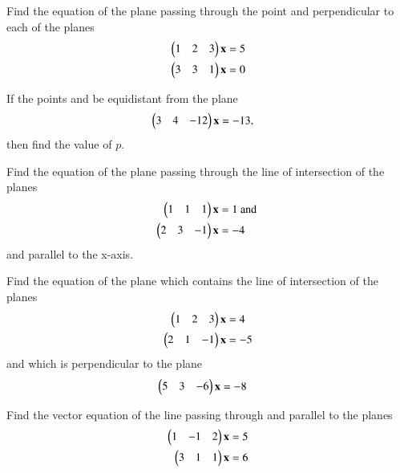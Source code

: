 \item Find the equation of the plane passing through the point  and perpendicular to each of the planes 
\begin{align}
\begin{pmatrix}1 & 2 & 3\end{pmatrix}\mathbf{x}&=5
\\
\begin{pmatrix}3 & 3 & 1\end{pmatrix}\mathbf{x}&=0
\end{align}
\item If the points  and  be equidistant from the plane 
\begin{align}
\begin{pmatrix}3 & 4 & -12\end{pmatrix}\mathbf{x}&=-13,
\end{align}
%
then find the value of $p$.
\item Find the equation of the plane passing through the line of intersection of the planes 
\begin{align}
\begin{pmatrix}1 & 1 & 1\end{pmatrix}\mathbf{x}&=1 \text{ and }
\\
\begin{pmatrix}2 & 3 & -1\end{pmatrix}\mathbf{x}&=-4
\end{align}
%
and parallel to the x-axis.
%
\item Find the equation of the plane which contains the line of intersection of the planes 
%
\begin{align}
\begin{pmatrix}1 & 2 & 3\end{pmatrix}\mathbf{x}&=4 
\\
\begin{pmatrix}2 & 1 & -1\end{pmatrix}\mathbf{x}&=-5
\end{align}
%
and which is perpendicular to the plane 
\begin{align}
\begin{pmatrix}5 & 3 & -6\end{pmatrix}\mathbf{x}&=-8
\end{align}
%
\item Find the vector equation of the line passing through  and parallel to the planes 
%
\begin{align}
\begin{pmatrix}1 & -1 & 2\end{pmatrix}\mathbf{x}&=5
\\
\begin{pmatrix}3 & 1 & 1\end{pmatrix}\mathbf{x}&=6
\end{align}
%
\solution
%

